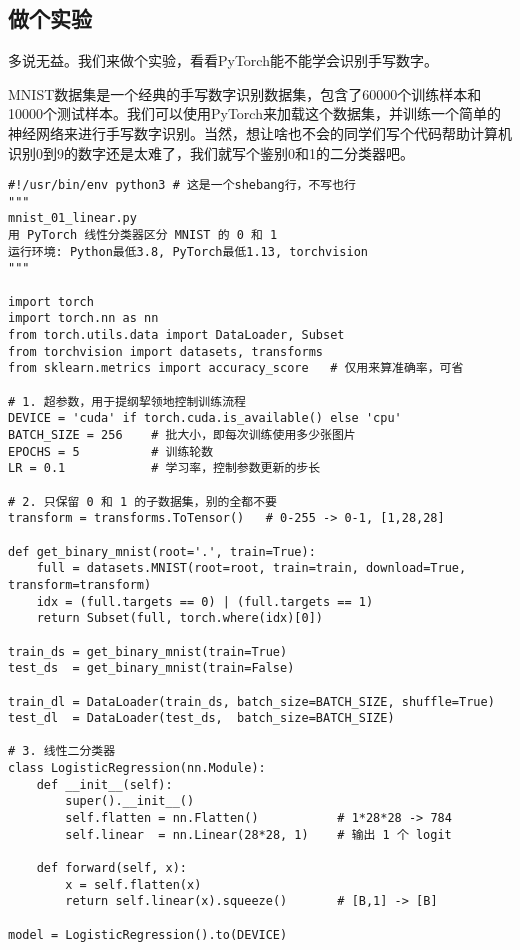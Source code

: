 \documentclass[../main.tex]{subfiles}
\begin{document}
\subsection{做个实验}

多说无益。我们来做个实验，看看PyTorch能不能学会识别手写数字。

MNIST数据集是一个经典的手写数字识别数据集，包含了60000个训练样本和10000个测试样本。我们可以使用PyTorch来加载这个数据集，并训练一个简单的神经网络来进行手写数字识别。当然，想让啥也不会的同学们写个代码帮助计算机识别0到9的数字还是太难了，我们就写个鉴别0和1的二分类器吧。

\begin{lstlisting}
#!/usr/bin/env python3 # 这是一个shebang行，不写也行
"""
mnist_01_linear.py
用 PyTorch 线性分类器区分 MNIST 的 0 和 1
运行环境: Python最低3.8, PyTorch最低1.13, torchvision
"""

import torch
import torch.nn as nn
from torch.utils.data import DataLoader, Subset
from torchvision import datasets, transforms
from sklearn.metrics import accuracy_score   # 仅用来算准确率，可省

# 1. 超参数，用于提纲挈领地控制训练流程
DEVICE = 'cuda' if torch.cuda.is_available() else 'cpu'
BATCH_SIZE = 256    # 批大小，即每次训练使用多少张图片
EPOCHS = 5          # 训练轮数
LR = 0.1            # 学习率，控制参数更新的步长

# 2. 只保留 0 和 1 的子数据集，别的全都不要
transform = transforms.ToTensor()   # 0-255 -> 0-1, [1,28,28]

def get_binary_mnist(root='.', train=True):
    full = datasets.MNIST(root=root, train=train, download=True, transform=transform)
    idx = (full.targets == 0) | (full.targets == 1)
    return Subset(full, torch.where(idx)[0])

train_ds = get_binary_mnist(train=True)
test_ds  = get_binary_mnist(train=False)

train_dl = DataLoader(train_ds, batch_size=BATCH_SIZE, shuffle=True)
test_dl  = DataLoader(test_ds,  batch_size=BATCH_SIZE)

# 3. 线性二分类器
class LogisticRegression(nn.Module):
    def __init__(self):
        super().__init__()
        self.flatten = nn.Flatten()           # 1*28*28 -> 784
        self.linear  = nn.Linear(28*28, 1)    # 输出 1 个 logit

    def forward(self, x):
        x = self.flatten(x)
        return self.linear(x).squeeze()       # [B,1] -> [B]

model = LogisticRegression().to(DEVICE)


\end{lstlisting}
\end{document}
